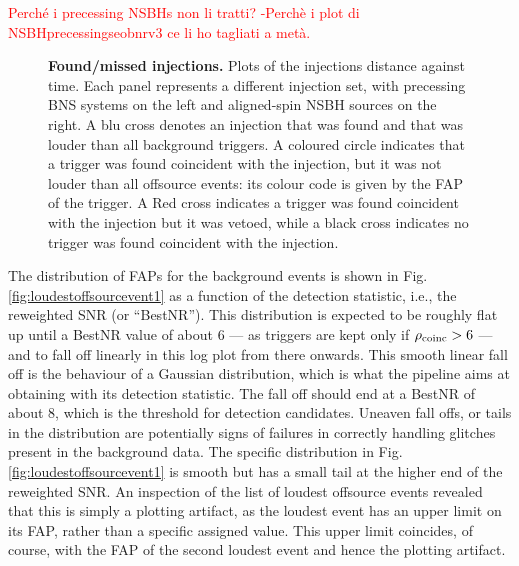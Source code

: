 \documentclass[binding=0.6cm, LaM]{sapthesis}
\newcommand{\fpg}[1]{\textcolor{red}{#1} }
\begin{document}
	\fpg{Perch\'e i precessing NSBHs non li tratti? -Perchè i plot di NSBHprecessingseobnrv3 ce li ho tagliati a metà.}

        \begin{figure}[!t]
          \noindent
          \label{missinj1}
          \centering
          \caption{\textbf{Found/missed injections.} Plots of the injections distance against time. Each panel represents a different injection set, with precessing BNS systems on the left and aligned-spin NSBH sources on the right. A blu cross denotes an injection that was found and that was louder than all background triggers. A coloured circle indicates that a trigger was found coincident with the injection, but it was not louder than all offsource events: its colour code is given by the FAP of the trigger.  A Red cross indicates a trigger was found coincident with the injection but it was vetoed, while a black cross indicates no trigger was found coincident with the injection.}
          \label{fig:missinj1}
        \end{figure}

	The distribution of FAPs for the background events is shown in Fig.\,\ref{fig:loudestoffsourcevent1} 
	as a function of the detection statistic, i.e., the reweighted SNR (or ``BestNR'').
	This distribution is expected to be roughly flat up until a BestNR value of about $6$ 
	--- as triggers are kept only if $\rho_{\rm coinc} > 6$ --- 
	and to fall off linearly in this log plot from there onwards.  
	This smooth linear fall off is the behaviour of a Gaussian distribution, 
	which is what the pipeline aims at obtaining with its detection statistic.  
	The fall off should end at a BestNR  of about $8$, 
	which is the threshold for detection candidates. 
	Uneaven fall offs, or tails in the distribution are potentially signs 
	of failures in correctly handling glitches present in the background data. 
	The specific distribution in Fig.\,\ref{fig:loudestoffsourcevent1} is smooth 
	but has a small tail at the higher end of the reweighted SNR.
	An inspection of the list of loudest offsource events revealed that 
	this is simply a plotting artifact, as the loudest event has an upper limit on its FAP, 
	rather than a specific assigned value.  
	This upper limit coincides, of course, with the FAP of the second loudest event and hence the plotting artifact.
\end{document}
